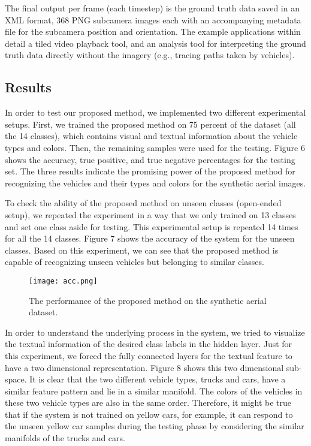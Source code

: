 \documentclass[conference]{IEEEtran}
\begin{document}
The final output per frame (each timestep) is the ground truth data saved in an XML format, 368 PNG subcamera images each with an accompanying metadata file for the subcamera position and orientation.  The example applications within \cite{griffith2018} detail a tiled video playback tool, and an analysis tool for interpreting the ground truth data directly without the imagery (e.g., tracing paths taken by vehicles). \\



\subsection{Results}

In order to test our proposed method, we implemented two different experimental setups. First, we trained the proposed method on 75 percent of the dataset (all the 14 classes), which contains visual and textual information about the vehicle types and colors. Then, the remaining samples were used for the testing. Figure 6 shows the accuracy, true positive, and true negative percentages for the testing set. The three results indicate the promising power of the proposed method for recognizing the vehicles and their types and colors for the synthetic aerial images. 

To check the ability of the proposed method on unseen classes (open-ended setup), we repeated the experiment in a way that we only trained on 13 classes and set one class aside for testing. This experimental setup is repeated 14 times for all the 14 classes. Figure 7 shows the accuracy of the system for the unseen classes. Based on this experiment, we can see that the proposed method is capable of recognizing unseen vehicles but belonging to similar classes.


\begin{figure}[!t]
\centering
\texttt{[image: acc.png]}
\caption{The performance of the proposed method on the synthetic aerial dataset.}
\label{fig_graph4}
\end{figure}



In order to understand the underlying process in the system, we tried to visualize the textual information of the desired class labels in the hidden layer. Just for this experiment, we forced the fully connected layers for the textual feature to have a two dimensional representation. Figure 8 shows this two dimensional sub-space. It is clear that the two different vehicle types, trucks and cars, have a similar feature pattern and lie in a similar manifold. The colors of the vehicles in these two vehicle types are also in the same order. Therefore, it might be true that if the system is not trained on yellow cars, for example, it can respond to the unseen yellow car samples during the testing phase by considering the similar manifolds of the trucks and cars.\\
\end{document}
